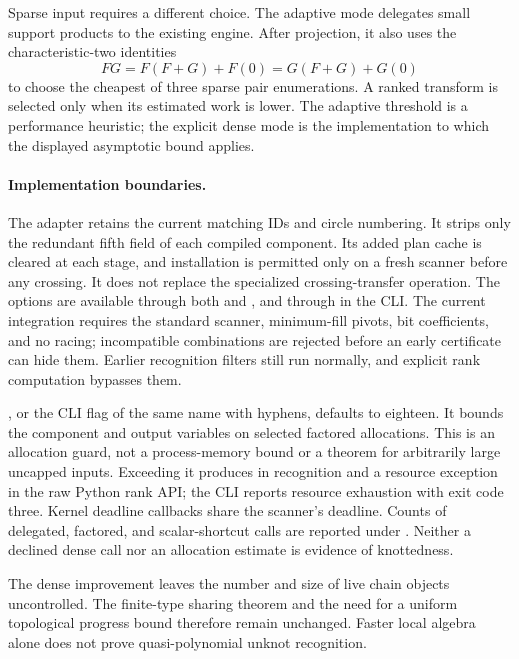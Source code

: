 Sparse input requires a different choice. The adaptive mode delegates
small support products to the existing engine. After projection, it
also uses the characteristic-two identities
\[
 FG=F(F+G)+F(0)=G(F+G)+G(0)
\]
to choose the cheapest of three sparse pair enumerations. A ranked
transform is selected only when its estimated work is lower. The
adaptive threshold is a performance heuristic; the explicit dense mode
is the implementation to which the displayed asymptotic bound applies.

\paragraph{Implementation boundaries.}
The adapter retains the current  matching IDs and circle
numbering. It strips only the redundant fifth field of each compiled
component. Its added plan cache is cleared at each stage, and installation
is permitted only on a fresh scanner before any crossing. It does not
replace the specialized crossing-transfer operation. The options are
available through both  and , and
through  in the
CLI. The current integration requires the standard scanner, minimum-fill
pivots, bit coefficients, and no racing; incompatible combinations are
rejected before an early certificate can hide them. Earlier recognition
filters still run normally, and explicit rank computation bypasses them.

, or the CLI flag of the same name
with hyphens, defaults to eighteen. It bounds the component and output
variables on selected factored allocations. This is an allocation guard,
not a process-memory bound or a theorem for arbitrarily large uncapped
inputs. Exceeding it produces  in recognition and a
resource exception in the raw Python rank API; the CLI reports resource
exhaustion with exit code three. Kernel deadline callbacks share the
scanner's deadline. Counts of delegated, factored, and scalar-shortcut
calls are reported under . Neither a declined
dense call nor an allocation estimate is evidence of knottedness.

The dense improvement leaves the number and size of live chain objects
uncontrolled. The finite-type sharing theorem and the need for a
uniform topological progress bound therefore remain unchanged. Faster
local algebra alone does not prove quasi-polynomial unknot recognition.


